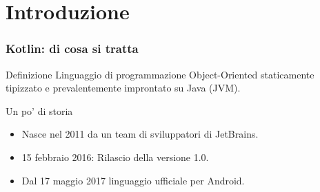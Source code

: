 \date[30 maggio 2018]{}


    \begin{frame}
        \titlepage
    \end{frame}
    \begin{frame}
      \tableofcontents
    \end{frame}

    \section{Introduzione}
    \begin{frame}
      \frametitle{Kotlin: di cosa si tratta}
        \begin{block}{Definizione}
          Linguaggio di programmazione Object-Oriented \alert{staticamente tipizzato} e
          prevalentemente improntato su Java (JVM).
        \end{block}

        \bigskip

        \begin{block}{Un po' di storia}
          \begin{itemize}[<+->]
            \item Nasce nel 2011 da un team di sviluppatori di JetBrains.
            \item 15 febbraio 2016: Rilascio della versione 1.0.
            \item Dal 17 maggio 2017 linguaggio \alert{ufficiale} per Android.
          \end{itemize}
        \end{block}
    \end{frame}

